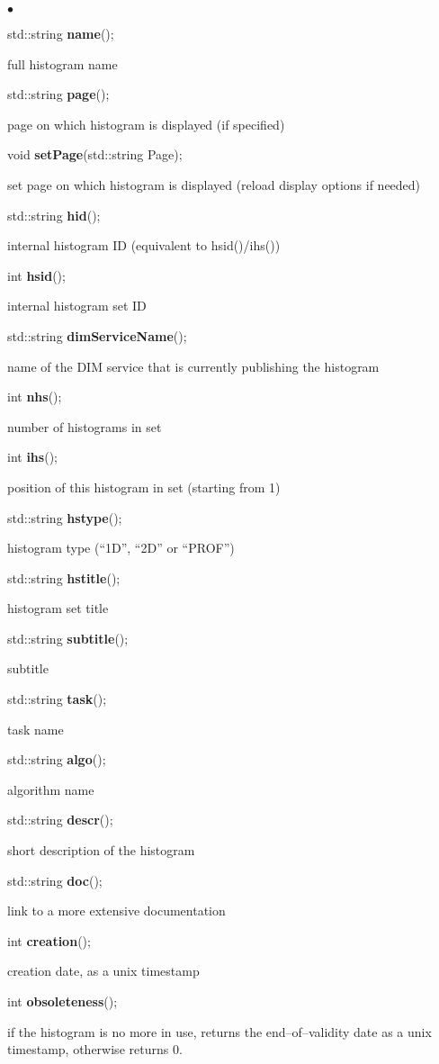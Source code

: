\documentclass{lhcbnote}
\begin{document}
\begin{list}{$\bullet$}{}
\item   std::string {\bf name}();

full histogram name
\item   std::string {\bf page}();

page on which histogram is displayed (if specified)
\item void {\bf setPage}(std::string Page);

set page on which histogram is displayed (reload display options if needed)


\item   std::string {\bf hid}();

internal histogram ID (equivalent to hsid()/ihs())
\item   int {\bf hsid}();

internal histogram set ID
\item   std::string {\bf dimServiceName}();

name of the DIM service that is currently publishing the histogram 
\item   int {\bf nhs}();

number of histograms in set
\item   int {\bf ihs}();

position of this histogram in set (starting from 1)
\item   std::string {\bf  hstype}();

histogram type (``1D'', ``2D'' or ``PROF'')
\item   std::string {\bf hstitle}();

histogram set title
\item   std::string {\bf subtitle}();

subtitle 
\item   std::string {\bf task}();

task name
\item   std::string {\bf algo}();

algorithm name

\item   std::string {\bf descr}();

short description of the histogram
\item   std::string {\bf doc}();

link to a more extensive documentation

\item   int {\bf creation}();

creation date, as a unix timestamp
\item   int {\bf obsoleteness}();

if the histogram is no more in use, returns the end--of--validity date
as a unix timestamp, otherwise returns 0. 
\end{list}
\end{document}
